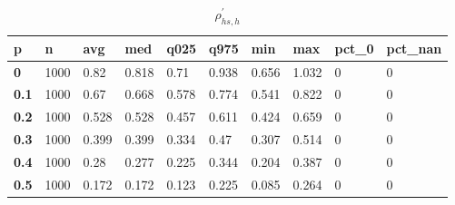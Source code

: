 \begin{table}[h]
 \centering 
\footnotesize
\caption{$\rho_{hs,h}^\prime $}
\label{tab:alphahsh}
\begin{tabular}[h]{|l|l|l|l|l|l|l|l|l|l|
    } \hline
\textbf{ p} & \textbf{ n} & \textbf{ avg} & \textbf{ med} & \textbf{ q025} & \textbf{ q975} & \textbf{ min} & \textbf{ max} & \textbf{ pct\_0} & \textbf{ pct\_nan}
    \\ \hline
  \textbf{  0} & 1000 &  0.82 & 0.818 &  0.71 & 0.938 & 0.656 & 1.032 & 0 & 0
    \\ \hline
  \textbf{0.1} & 1000 &  0.67 & 0.668 & 0.578 & 0.774 & 0.541 & 0.822 & 0 & 0
    \\ \hline
  \textbf{0.2} & 1000 & 0.528 & 0.528 & 0.457 & 0.611 & 0.424 & 0.659 & 0 & 0
    \\ \hline
  \textbf{0.3} & 1000 & 0.399 & 0.399 & 0.334 &  0.47 & 0.307 & 0.514 & 0 & 0
    \\ \hline
  \textbf{0.4} & 1000 &  0.28 & 0.277 & 0.225 & 0.344 & 0.204 & 0.387 & 0 & 0
    \\ \hline
  \textbf{0.5} & 1000 & 0.172 & 0.172 & 0.123 & 0.225 & 0.085 & 0.264 & 0 & 0
    \\ \hline
 \end{tabular}
 \end{table}
